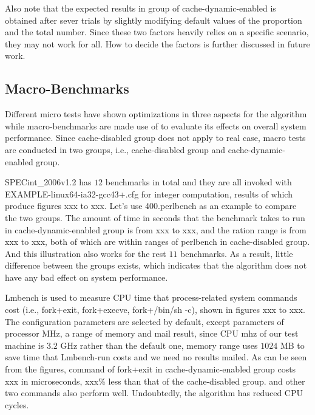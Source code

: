 \documentclass[letterpaper,twocolumn,10pt]{article}
\begin{document}
Also note that the expected results in group of cache-dynamic-enabled is obtained after sever trials by slightly modifying default values of the proportion and the total number. Since these two factors heavily relies on a specific scenario, they may not work for all. How to decide the factors is further discussed in future work.

\subsection{Macro-Benchmarks}

Different micro tests have shown optimizations in three aspects for the algorithm while macro-benchmarks are made use of to evaluate its effects on overall system performance. Since cache-disabled group does not apply to real case, macro tests are conducted in two groups, i.e., cache-disabled group and cache-dynamic-enabled group.

SPECint\_2006v1.2 has $12$ benchmarks in total and they are all invoked with EXAMPLE-linux64-ia32-gcc43+.cfg for integer computation, results of which produce figures xxx to xxx. Let’s use 400.perlbench as an example to compare the two groups. The amount of time in seconds that the benchmark takes to run in cache-dynamic-enabled group is from xxx to xxx, and the ration range is from xxx to xxx, both of which are within ranges of perlbench in cache-disabled group. And this illustration also works for the rest $11$ benchmarks. As a result, little difference between the groups exists, which indicates that the algorithm does not have any bad effect on system performance.

Lmbench is used to measure CPU time that process-related system commands cost (i.e., fork+exit, fork+execve, fork+/bin/sh -c), shown in figures xxx to xxx. The configuration parameters are selected by default, except parameters of processor MHz, a range of memory and mail result, since CPU mhz of our test machine is $3.2$ GHz rather than the default one, memory range uses $1024$ MB to save time that Lmbench-run costs and we need no results mailed. As can be seen from the figures, command of fork+exit in cache-dynamic-enabled group costs xxx in microseconds, xxx\% less than that of the cache-disabled group. and other two commands also perform well. Undoubtedly, the algorithm has reduced CPU cycles.
\end{document}

